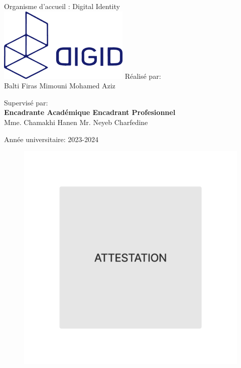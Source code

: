 \begin{center}
    Organisme d'accueil : Digital Identity
    \\
    \vskip 1cm
    \includegraphics[width=0.18 \columnwidth]{chap1.images/digidlogo.png}
    \vskip 2.5cm
    Réalisé par:
    \\  Balti Firas \hfill  Mimouni Mohamed Aziz   \\
    \vskip 0.8cm

    Supervisé par: \\
    \textbf{Encadrante Académique   \hfill   Encadrant Profesionnel   }
    \\ Mme. Chamakhi Hanen   \hfill     Mr. Neyeb Charfedine  \\


\end{center}

\vfill
\begin{center}


    \vskip 1cm
    \footnotesize{Année universitaire: 2023-2024}
    \\

\end{center}



\begin{figure}[p]
    \centering
    \includegraphics[width=1\textwidth]{chap1.images/ATTESTATION.png}
\end{figure}


